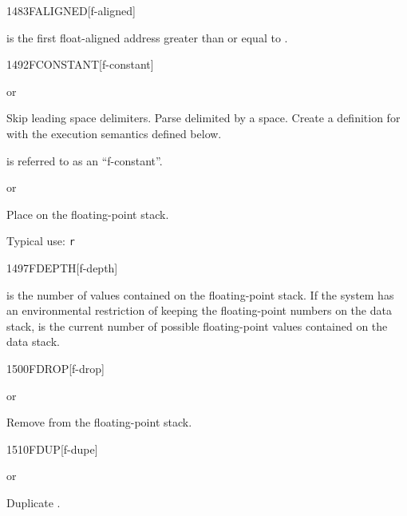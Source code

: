 \begin{worddef}{1483}{FALIGNED}[f-aligned]
\item {}

	 is the first float-aligned address greater than
	or equal to .
\end{worddef}


\begin{worddef}{1492}{FCONSTANT}[f-constant]
\item {}  or

	Skip leading space delimiters. Parse  delimited by a
	space. Create a definition for  with the execution
	semantics defined below.

	 is referred to as an ``f-constant''.

\execute[name]
	\stack{}{}  or

	Place  on the floating-point stack.


	\begin{rationale} %
		Typical use: \texttt{r}  
	\end{rationale}
\end{worddef}


\begin{worddef}{1497}{FDEPTH}[f-depth]
\item {}

	 is the number of values contained on the
	floating-point stack. If the system has an environmental
	restriction of keeping the floating-point numbers on the
	data stack,  is the current number of possible
	floating-point values contained on the data stack.
\end{worddef}


\begin{worddef}{1500}{FDROP}[f-drop]
\item {} or

	Remove  from the floating-point stack.
\end{worddef}


\begin{worddef}{1510}{FDUP}[f-dupe]
\item {} or

	Duplicate .
\end{worddef}


